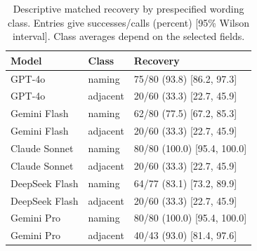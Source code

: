 \begin{table}[t]\centering\scriptsize\setlength{\tabcolsep}{3pt}
\caption{Descriptive matched recovery by prespecified wording class. Entries give successes/calls (percent) [95\% Wilson interval]. Class averages depend on the selected fields.}\label{tab:classes}
\begin{tabular}{@{}lll@{}}
\toprule
Model & Class & Recovery \\\midrule
GPT-4o & naming & 75/80 (93.8) [86.2, 97.3] \\
GPT-4o & adjacent & 20/60 (33.3) [22.7, 45.9] \\
Gemini Flash & naming & 62/80 (77.5) [67.2, 85.3] \\
Gemini Flash & adjacent & 20/60 (33.3) [22.7, 45.9] \\
Claude Sonnet & naming & 80/80 (100.0) [95.4, 100.0] \\
Claude Sonnet & adjacent & 20/60 (33.3) [22.7, 45.9] \\
DeepSeek Flash & naming & 64/77 (83.1) [73.2, 89.9] \\
DeepSeek Flash & adjacent & 20/60 (33.3) [22.7, 45.9] \\
Gemini Pro & naming & 80/80 (100.0) [95.4, 100.0] \\
Gemini Pro & adjacent & 40/43 (93.0) [81.4, 97.6] \\
\bottomrule
\end{tabular}\end{table}
